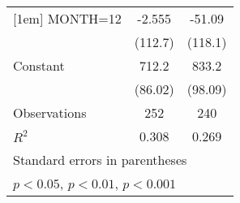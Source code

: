 {\begin{tabular}{l*{2}{c}}
[1em]
MONTH=12        &   -2.555         &   -51.09         \\
                &  (112.7)         &  (118.1)         \\
[1em]
Constant        &    712.2\sym{***}&    833.2\sym{***}\\
                &  (86.02)         &  (98.09)         \\
\hline
Observations    &      252         &      240         \\
\(R^{2}\)       &    0.308         &    0.269         \\
\hline\hline
\multicolumn{3}{l}{\footnotesize Standard errors in parentheses}\\
\multicolumn{3}{l}{\footnotesize \sym{*} \(p<0.05\), \sym{**} \(p<0.01\), \sym{***} \(p<0.001\)}\\
\end{tabular}
}
